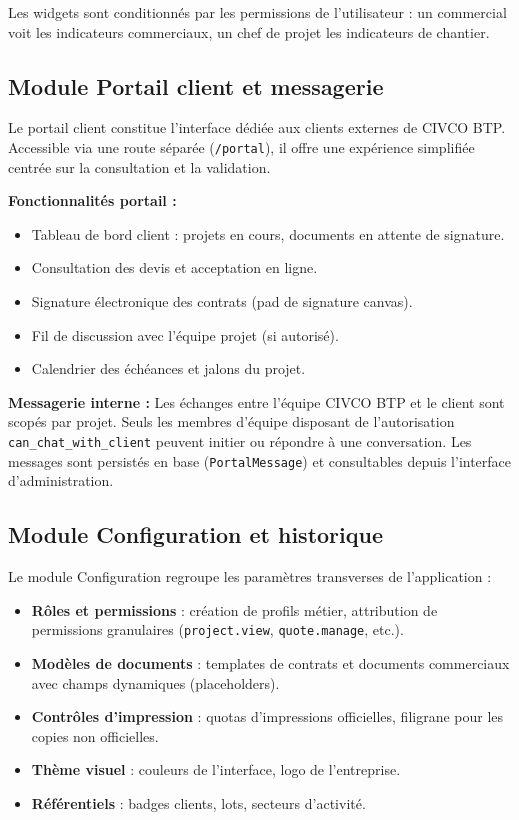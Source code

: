 Les widgets sont conditionnés par les permissions de l'utilisateur : un commercial
voit les indicateurs commerciaux, un chef de projet les indicateurs de chantier.

\subsection{Module Portail client et messagerie}

Le portail client constitue l'interface dédiée aux clients externes de CIVCO BTP.
Accessible via une route séparée (\texttt{/portal}), il offre une expérience simplifiée
centrée sur la consultation et la validation.

\medskip

\textbf{Fonctionnalités portail :}
\begin{itemize}
  \item Tableau de bord client : projets en cours, documents en attente de signature.
  \item Consultation des devis et acceptation en ligne.
  \item Signature électronique des contrats (pad de signature canvas).
  \item Fil de discussion avec l'équipe projet (si autorisé).
  \item Calendrier des échéances et jalons du projet.
\end{itemize}

\medskip

\textbf{Messagerie interne :} Les échanges entre l'équipe CIVCO BTP et le client sont
scopés par projet. Seuls les membres d'équipe disposant de l'autorisation
\texttt{can\_chat\_with\_client} peuvent initier ou répondre à une conversation.
Les messages sont persistés en base (\texttt{PortalMessage}) et consultables depuis
l'interface d'administration.

\subsection{Module Configuration et historique}

Le module Configuration regroupe les paramètres transverses de l'application :

\begin{itemize}
  \item \textbf{Rôles et permissions} : création de profils métier, attribution de
  permissions granulaires (\texttt{project.view}, \texttt{quote.manage}, etc.).
  \item \textbf{Modèles de documents} : templates de contrats et documents commerciaux
  avec champs dynamiques (placeholders).
  \item \textbf{Contrôles d'impression} : quotas d'impressions officielles, filigrane
  pour les copies non officielles.
  \item \textbf{Thème visuel} : couleurs de l'interface, logo de l'entreprise.
  \item \textbf{Référentiels} : badges clients, lots, secteurs d'activité.
\end{itemize}

